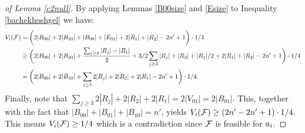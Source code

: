\begin{proof}[of Lemma \ref{c2null}]
By applying Lemmas \ref{B00size} and \ref{Esize} to Inequality \eqref{bachekhoshgel} we have:
\begin{equation*}
\begin{split}
V_i(\mathcal{F}) & = \bigg(2|B_{00}|+2|B_{10}| + |B_{00}| + |E_{01}| + 2|R_1| + |R_2| - 2n' + 1\bigg) \cdot 1/4\\
&\geq \bigg(2|B_{00}|+2|B_{10}| + \frac{\sum_{j \geq 3}|R_j| - |R_1|}{2} + 3/2 \sum_{j \geq 3}|R_j| + |R_2| + |R_1|/2 + 2|R_1| + |R_2| - 2n' + 1\bigg)\cdot 1/4 \\
&= \bigg(2|B_{00}|+2|B_{10}| + \sum_{j \geq 3} 2|R_j| + 2|R_2| + 2|R_1| - 2n' + 1 \bigg)\cdot 1/4
\end{split}
\end{equation*} 
Finally, note that $\sum_{j \geq 3} 2|R_j| + 2|R_2| + 2|R_1| = 2|V_{01}| = 2|B_{01}|$. This, together with the fact that $|B_{00}| + |B_{01}| + |B_{10}| = n'$, yields $V_i(\mathcal{F}) \geq (2n' - 2n' + 1)\cdot 1/4$. This means $V_i(\mathcal{F}) \geq 1/4$ which is a contradiction since $\mathcal{F}$ is feasible for $a_i$.
\begin{comment}
\begin{lemma}
\label{capability}
Total items in $cal M$ is enough to fill in $2n$ slots. 
\end{lemma}

\begin{proof}

The blue items, can singly fill in a slot. Also, each pair of red items can fill a slot. For simplicity, we assume that each red item can fill a half slot. 

Now, consider the items from the viewpoint of $\agent_i$. Each partition in $B_{10}$ is enough to fill in $2|B_{10}|$ slots. Also, all the partitions $b_i \in B_{01}$ with $b_i \in R_1$ is enough to fill in $ 2.5$ slots. Furthermore every partition $b_i \in B_{01}$ with $b_i \in R_3$ is capable of filling $1.5$ slots. By lemma \ref{B00size}, we know that the number of such partitions is less than $\frac{B_{00}}{2}+ R_1$. On the other hand, each partition in $B_{00}$ is capable of filling $3$ slots. So, total number of slots that can be filled by $\cal M$ is at least:
\begin{align*} 
2|B_{10}| + 3|B_{00}| + 2.5|R_1| + 1.5|R_3| \\ > 2|B_{10}|+ 2|B_{00}| + 2|R_1| + 2 |R_3| - (2*\frac{|R_3|}{2} - \frac{|B_{00}|}{2} + \frac{|R_1|}{2}) \\ > 2|B_{10}|+ 2|B_{00}| + 2|R_1| + 2 |R_3| = 2n
\end{align*}

 So, total items in $\cal M$ is capable of filling $2n$ slots, from the viewpoint of $\agent_i$. 
\end{proof}

So, by lemma \ref{capability}, $\agent_i$ can fill in $2n$ slots, that contradicts the deadlock situation. 
\end{comment}
\end{proof}

